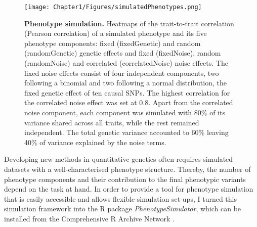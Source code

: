 \begin{figure}[hbtp]
	\centering
	\texttt{[image: Chapter1/Figures/simulatedPhenotypes.png]}
	\caption[\textbf{Phenotype simulation.}]{\textbf{Phenotype simulation.} Heatmaps of the trait-to-trait correlation (Pearson correlation) of a simulated phenotype and its five phenotype components: fixed (fixedGenetic) and random (randomGenetic) genetic effects and fixed (fixedNoise), random (randomNoise) and correlated (correlatedNoise) noise effects. The fixed noise effects consist of four independent components, two following a binomial and two following a normal distribution, the fixed genetic effect of ten causal SNPs. The highest correlation for the correlated noise effect was set at \num{0.8}. Apart from the correlated noise component, each component was simulated with \num{80}\% of its variance shared across all traits, while the rest remained independent. The total genetic variance accounted to \num{60}\% leaving \num{40}\% of variance explained by the noise terms.}
	\label{fig:simulation}
\end{figure}


Developing new methods in quantitative genetics often requires simulated datasets with a well-characterised phenotype structure. Thereby, the number of phenotype components and their contribution to the final phenotypic variants depend on the task at hand. In order to provide a tool for phenotype simulation that is easily accessible and allows flexible simulation set-ups, I turned this simulation framework into the R package \textit{PhenotypeSimulator}, which can be installed from the Comprehensive R Archive Network \citep{Meyer2017} .

